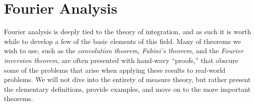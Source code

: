 \chapter{Fourier Analysis}
    Fourier analysis is deeply tied to the theory of integration, and as such
    it is worth while to develop a few of the basic elements of this field.
    Many of theorems we wish to use, such as the \textit{convolution theorem},
    \textit{Fubini's theorem}, and the \textit{Fourier inversion theorem},
    are often presented with hand-wavy ``proofs,'' that obscure some of the
    problems that arise when applying these results to real-world problems. We
    will not dive into the entirety of measure theory, but rather present the
    elementary definitions, provide examples, and move on to the
    more important theorems.
